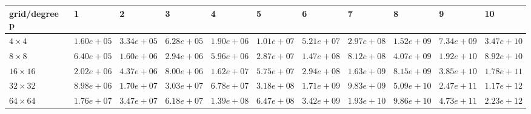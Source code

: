 \begin{tabular}{lllllllllll}
\hline
 grid/degree p   & 1          & 2          & 3          & 4          & 5          & 6          & 7          & 8          & 9          & 10         \\
\hline
 $4 \times 4$    & $1.60e+05$ & $3.34e+05$ & $6.28e+05$ & $1.90e+06$ & $1.01e+07$ & $5.21e+07$ & $2.97e+08$ & $1.52e+09$ & $7.34e+09$ & $3.47e+10$ \\
 $8 \times 8$    & $6.40e+05$ & $1.60e+06$ & $2.94e+06$ & $5.96e+06$ & $2.87e+07$ & $1.47e+08$ & $8.12e+08$ & $4.07e+09$ & $1.92e+10$ & $8.92e+10$ \\
 $16 \times 16$  & $2.02e+06$ & $4.37e+06$ & $8.00e+06$ & $1.62e+07$ & $5.75e+07$ & $2.94e+08$ & $1.63e+09$ & $8.15e+09$ & $3.85e+10$ & $1.78e+11$ \\
 $32 \times 32$  & $8.98e+06$ & $1.70e+07$ & $3.03e+07$ & $6.78e+07$ & $3.18e+08$ & $1.71e+09$ & $9.83e+09$ & $5.09e+10$ & $2.47e+11$ & $1.17e+12$ \\
 $64 \times 64$  & $1.76e+07$ & $3.47e+07$ & $6.18e+07$ & $1.39e+08$ & $6.47e+08$ & $3.42e+09$ & $1.93e+10$ & $9.86e+10$ & $4.73e+11$ & $2.23e+12$ \\
\hline
\end{tabular}